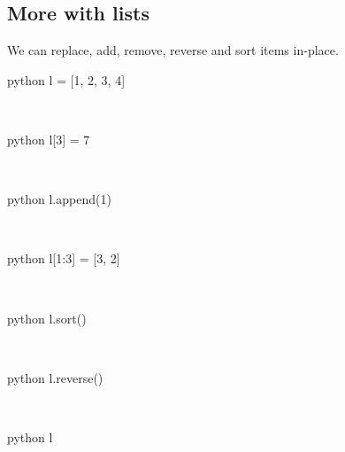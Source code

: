 \documentclass[aspectratio=1610,slidestop]{beamer}
\begin{document}
\subsection{More with lists}
\begin{pframe}
 We can replace, add, remove, reverse and sort items in-place.
 \begin{ipython}
  \begin{pythonin}{python}
l = [1, 2, 3, 4]
  \end{pythonin}
  \\
  \begin{pythonin}{python}
l[3] = 7
  \end{pythonin}
  \\
  \begin{pythonin}{python}
l.append(1)
  \end{pythonin}
  \\
  \begin{pythonin}{python}
l[1:3] = [3, 2]
  \end{pythonin}
  \\
  \begin{pythonin}{python}
l.sort()
  \end{pythonin}
  \\
  \begin{pythonin}{python}
l.reverse()
  \end{pythonin}
  \\
  \begin{pythonin}{python}
l
  \end{pythonin}
  \\
  \begin{pythonout}
[7, 3, 2, 1, 1]
  \end{pythonout}
 \end{ipython}
\end{pframe}
\end{document}
